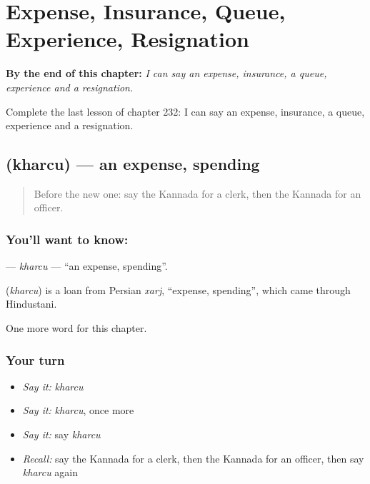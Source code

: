 
\chapter{Expense, Insurance, Queue, Experience, Resignation}
\label{ch:ka-expense-insurance-queue-experience-resignation}

\begin{chapteropening}
\textbf{By the end of this chapter:} \emph{I can say an expense, insurance, a queue, experience and a resignation.}

Complete the last lesson of chapter 232: I can say an expense, insurance, a queue, experience and a resignation.
\end{chapteropening}

\section[\texorpdfstring{\kn{ಖರ್ಚು} (kharcu)}{ಖರ್ಚು (kharcu)}]{ (kharcu) — an expense, spending}

\label{lesson:KA-C232-kharcu}



\begin{quote}
Before the new one: say the Kannada for a clerk, then the Kannada for an officer.
\end{quote}

\subsection*{You'll want to know: }
\textbf{} — \emph{kharcu} — \textquotedblleft{}an expense, spending\textquotedblright{}.

\begin{cousinweb}
\textbf{} (\emph{kharcu}) is a loan from Persian \emph{xarj}, \textquotedblleft{}expense, spending\textquotedblright{}, which came through Hindustani.
\end{cousinweb}

\begin{grammarlens}[title={What you've built}]
One more word for this chapter.
\end{grammarlens}

\subsection*{Your turn}
\begin{itemize}
\raggedright
  \item \emph{Say it:} \emph{kharcu}
  \item \emph{Say it:} \emph{kharcu}, once more
  \item \emph{Say it:} say \emph{kharcu}
  \item \emph{Recall:} say the Kannada for a clerk, then the Kannada for an officer, then say \emph{kharcu} again
\end{itemize}

